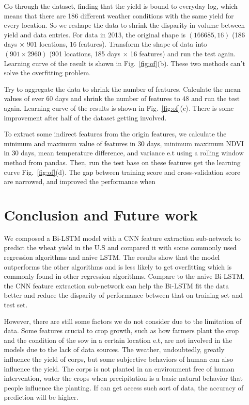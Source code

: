 \documentclass[conference, a4paper]{IEEEtran}
\begin{document}
  Go through the dataset, finding that the yield is bound to everyday log, which means that there are 186 different weather conditions with the same yield for every location. So we reshape the data to shrink the disparity in volume between yield and data entries. For data in 2013, the original shape is $(166685,16)$ (186 days $\times$ 901 locations,  16 features). Transform the shape of data into $(901\times2960)$ (901 locations, 185 days $\times$ 16 features) and run the test again. Learning curve of the result is shown in Fig.~\ref{fig:of}(b). These two methods can't solve the overfitting problem.

  Try to aggregate the data to shrink the number of features. Calculate the mean values of ever 60 days and shrink the number of features to 48 and run the test again. Learning curve of the results is shown in Fig.~\ref{fig:of}(c). There is some improvement after half of the dataset getting involved.

  To extract some indirect features from the origin features, we calculate the minimum and maximum value of features in 30 days, minimum maximum NDVI in 30 days, mean temperature difference, and variance e.t using a rolling window method from pandas. Then, run the test base on these features get the learning curve Fig.~\ref{fig:of}(d). The gap between training score and cross-validation score are narrowed, and improved the performance when 


\section{Conclusion and Future work} \label{sec:con}
  We composed a Bi-LSTM model with a CNN feature extraction sub-network to predict the wheat yield in the U.S and compared it with some commonly used regression algorithms and naive LSTM. The results show that the model outperforms the other algorithms and is less likely to get overfitting which is commonly found in other regression algorithms. Compare to the naive Bi-LSTM, the CNN feature extraction sub-network can help the Bi-LSTM fit the data better and reduce the disparity of performance between that on training set and test set.
  
  However, there are still some factors we do not consider due to the limitation of data. Some features crucial to crop growth, such as how farmers plant the crop and the condition of the sow in a certain location e.t, are not involved in the models due to the lack of data sources. The weather, undoubtedly, greatly influence the yield of corps, but some subjective behaviors of human can also influence the yield. The corps is not planted in an environment free of human intervention, water the crops when precipitation is a basic natural behavior that people influence the planting. If can get access such sort of data, the accuracy of prediction will be higher. 



\end{document}
